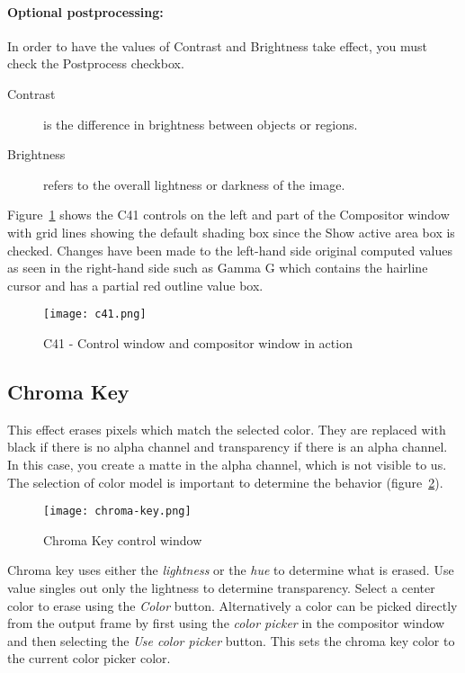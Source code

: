 \paragraph{Optional postprocessing:} In order to have the values of Contrast and Brightness take effect, you must check the Postprocess checkbox.
\begin{description}
    \item[Contrast] is the difference in brightness between objects or regions.
    \item[Brightness] refers to the overall lightness or darkness of the image.
\end{description}

Figure~\ref{fig:c41} shows the C41 controls on the left and part of the Compositor window with grid lines showing the default shading box since the Show active area box is checked. Changes have been made to the left-hand side original computed values as seen in the right-hand side such as Gamma G which contains the hairline cursor and has a partial red outline value box.

\begin{figure}[htpb]
    \centering
    \texttt{[image: c41.png]}
    \caption{C41 - Control window and compositor window in action}
    \label{fig:c41}
\end{figure}

\subsection{Chroma Key}%
\label{sub:chroma_key}

This effect erases pixels which match the selected color. They are replaced with black if there is no alpha channel and transparency if there is an alpha channel. In this case, you create a matte in the alpha channel, which is not visible to us. The selection of color model is important to determine the behavior (figure~\ref{fig:chroma-key}).

\begin{figure}[htpb]
    \centering
    \texttt{[image: chroma-key.png]}
    \caption{Chroma Key control window}
    \label{fig:chroma-key}
\end{figure}

Chroma key uses either the \textit{lightness} or the \textit{hue} to determine what is erased. Use value singles out only the lightness to determine transparency.
Select a center color to erase using the \textit{Color} button. Alternatively a color can be picked directly from the output frame by first using the \textit{color picker} in the compositor window and then selecting the \textit{Use color picker} button. This sets the chroma key color to the current color picker color.

